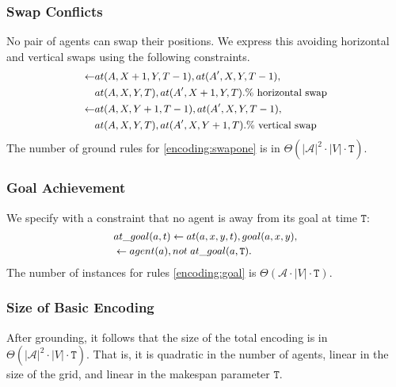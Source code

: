 \subsubsection{Swap Conflicts}
No pair of agents can swap their positions. We express this avoiding horizontal and vertical swaps using the following constraints.
\begin{equation}\small\label{encoding:swapone}
  \begin{split}
        \leftarrow &at(A,X+1,Y,T-1), at(A',X,Y,T-1),\\
        &at(A,X,Y,T), at(A',X+1,Y,T). \text{\% horizontal swap} \\
        \leftarrow &at(A,X,Y+1,T-1), at(A',X,Y,T-1),\\
        &at(A,X,Y,T), at(A',X,Y+1,T). \text{\% vertical swap}
  \end{split}
\end{equation}
The number of ground rules for \eqref{encoding:swapone} is in $\Theta(|\mathcal{A}|^2 \cdot |V| \cdot \mathtt{T})$.

\subsubsection{Goal Achievement}
We specify with a constraint that no agent is away from its goal at time $\mathtt{T}$:
\begin{equation}\small\label{encoding:goal}
  \begin{split}
&at\_goal(a,t) \leftarrow at(a,x,y,t), goal(a,x,y),\\
&\leftarrow agent(a), not \; at\_goal(a,\mathtt{T}).
\end{split}
\end{equation}
The number of instances for rules \eqref{encoding:goal} is $\Theta(\mathcal{A} \cdot |V| \cdot \mathtt{T})$.
\subsubsection{Size of Basic Encoding}
After grounding, it follows that the size of the total encoding is in $\Theta(|\mathcal{A}|^2 \cdot |V| \cdot \mathtt{T})$. That is, it is quadratic in the number of agents, linear in the size of the grid, and linear in the makespan parameter $\mathtt{T}$.
